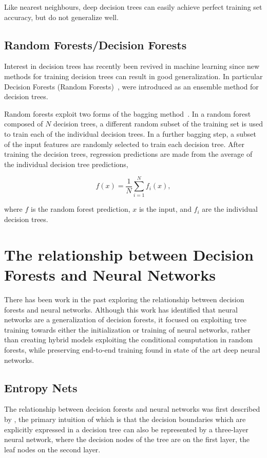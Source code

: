 \documentclass[thesis]{subfiles}
\begin{document}
Like nearest neighbours, deep decision trees can easily achieve perfect training set accuracy, but do not generalize well. 

\subsection{Random Forests/Decision Forests}
Interest in decision trees has recently been revived in machine learning since new methods for training decision trees can result in good generalization. In particular Decision Forests (Random Forests)~\citep{journals/neco/AmitG97,breiman2001random}, were introduced as an ensemble method for decision trees.

Random forests exploit two forms of the bagging method~\citep{breiman1996bagging}. In a random forest composed of $N$ decision trees, a different random subset of the training set is used to train each of the individual decision trees. In a further bagging step, a subset of the input features are randomly selected to train each decision tree. After training the decision trees, regression predictions are made from the average of the individual decision tree predictions,

\begin{equation}
	f(x) = \frac{1}{N} \sum_{i=1}^{N} f_i(x),
\end{equation}

where $f$ is the random forest prediction, $x$ is the input, and $f_i$ are the individual decision trees.

\section{The relationship between Decision Forests and Neural Networks}
There has been work in the past exploring the relationship between decision forests and neural networks. Although this work has identified that neural networks are a generalization of decision forests, it focused on exploiting tree training towards either the initialization or training of neural networks, rather than creating hybrid models exploiting the conditional computation in random forests, while preserving end-to-end training found in state of the art deep neural networks.


\subsection{Entropy Nets}
The relationship between decision forests and neural networks was first described by \citet{Sethi1990}, the primary intuition of which is that the decision boundaries which are explicitly expressed in a decision tree can also be represented by a three-layer neural network, where the decision nodes of the tree are on the first layer, the leaf nodes on the second layer.
\end{document}
